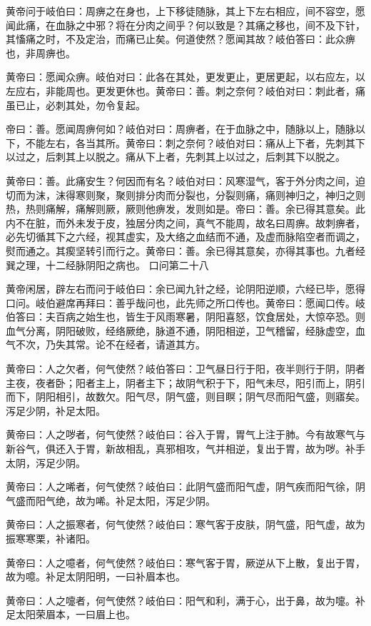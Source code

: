 \documentclass[a4paper,12pt,UTF8,twoside]{ctexbook}
\begin{document}
	黄帝问于岐伯曰：周痹之在身也，上下移徒随脉，其上下左右相应，间不容空，愿闻此痛，在血脉之中邪？将在分肉之间乎？何以致是？其痛之移也，间不及下针，其慉痛之时，不及定治，而痛已止矣。何道使然？愿闻其故？岐伯答曰：此众痹也，非周痹也。
	
	黄帝曰：愿闻众痹。岐伯对曰：此各在其处，更发更止，更居更起，以右应左，以左应右，非能周也。更发更休也。黄帝曰：善。刺之奈何？岐伯对曰：刺此者，痛虽已止，必刺其处，勿令复起。
	
	帝曰：善。愿闻周痹何如？岐伯对曰：周痹者，在于血脉之中，随脉以上，随脉以下，不能左右，各当其所。黄帝曰：刺之奈何？岐伯对曰：痛从上下者，先刺其下以过之，后刺其上以脱之。痛从下上者，先刺其上以过之，后刺其下以脱之。
	
	黄帝曰：善。此痛安生？何因而有名？岐伯对曰：风寒湿气，客于外分肉之间，迫切而为沫，沫得寒则聚，聚则排分肉而分裂也，分裂则痛，痛则神归之，神归之则热，热则痛解，痛解则厥，厥则他痹发，发则如是。帝曰：善。余已得其意矣。此内不在脏，而外未发于皮，独居分肉之间，真气不能周，故名曰周痹。故刺痹者，必先切循其下之六经，视其虚实，及大络之血结而不通，及虚而脉陷空者而调之，熨而通之。其瘈坚转引而行之。黄帝曰：善。余已得其意矣，亦得其事也。九者经巽之理，十二经脉阴阳之病也。
	口问第二十八
	
	黄帝闲居，辟左右而问于岐伯曰：余已闻九针之经，论阴阳逆顺，六经已毕，愿得口问。岐伯避席再拜曰：善乎哉问也，此先师之所口传也。黄帝曰：愿闻口传。岐伯答曰：夫百病之始生也，皆生于风雨寒暑，阴阳喜怒，饮食居处，大惊卒恐。则血气分离，阴阳破败，经络厥绝，脉道不通，阴阳相逆，卫气稽留，经脉虚空，血气不次，乃失其常。论不在经者，请道其方。
	
	黄帝曰：人之欠者，何气使然？岐伯答曰：卫气昼日行于阳，夜半则行于阴，阴者主夜，夜者卧；阳者主上，阴者主下；故阴气积于下，阳气未尽，阳引而上，阴引而下，阴阳相引，故数欠。阳气尽，阴气盛，则目瞑；阴气尽而阳气盛，则寤矣。泻足少阴，补足太阳。
	
	黄帝曰：人之哕者，何气使然？岐伯曰：谷入于胃，胃气上注于肺。今有故寒气与新谷气，俱还入于胃，新故相乱，真邪相攻，气并相逆，复出于胃，故为哕。补手太阴，泻足少阴。
	
	黄帝曰：人之唏者，何气使然？岐伯曰：此阴气盛而阳气虚，阴气疾而阳气徐，阴气盛而阳气绝，故为唏。补足太阳，泻足少阴。
	
	黄帝曰：人之振寒者，何气使然？岐伯曰：寒气客于皮肤，阴气盛，阳气虚，故为振寒寒栗，补诸阳。
	
	黄帝曰：人之噫者，何气使然？岐伯曰：寒气客于胃，厥逆从下上散，复出于胃，故为噫。补足太阴阳明，一曰补眉本也。
	
	黄帝曰：人之嚏者，何气使然？岐伯曰：阳气和利，满于心，出于鼻，故为嚏。补足太阳荣眉本，一曰眉上也。
	
\end{document}
